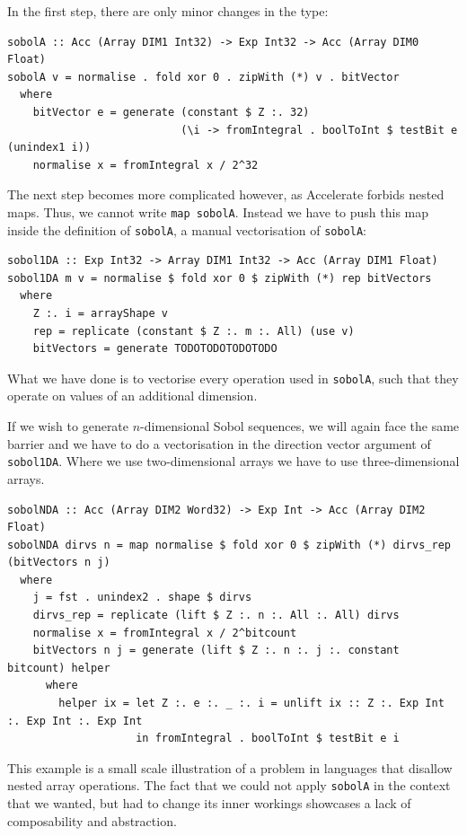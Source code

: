 \documentclass{llncs2e/llncs}
\begin{document}
In the first step, there are only minor changes in the type:
\begin{verbatim}
sobolA :: Acc (Array DIM1 Int32) -> Exp Int32 -> Acc (Array DIM0 Float)
sobolA v = normalise . fold xor 0 . zipWith (*) v . bitVector
  where
    bitVector e = generate (constant $ Z :. 32)
                           (\i -> fromIntegral . boolToInt $ testBit e (unindex1 i))
    normalise x = fromIntegral x / 2^32
\end{verbatim}

The next step becomes more complicated however, as Accelerate forbids
nested maps. Thus, we cannot write \verb|map sobolA|.
Instead we have to push this map inside the definition of
\verb|sobolA|, a manual vectorisation of \verb|sobolA|:
\begin{verbatim}
sobol1DA :: Exp Int32 -> Array DIM1 Int32 -> Acc (Array DIM1 Float)
sobol1DA m v = normalise $ fold xor 0 $ zipWith (*) rep bitVectors
  where
    Z :. i = arrayShape v
    rep = replicate (constant $ Z :. m :. All) (use v)
    bitVectors = generate TODOTODOTODOTODO
\end{verbatim}
What we have done is to vectorise every operation used in
\verb|sobolA|, such that they operate on values of an additional
dimension.

If we wish to generate $n$-dimensional Sobol sequences, we will again
face the same barrier and we have to do a vectorisation in the
direction vector argument of \verb|sobol1DA|. Where we use
two-dimensional arrays we have to use three-dimensional arrays. %

\begin{verbatim}
sobolNDA :: Acc (Array DIM2 Word32) -> Exp Int -> Acc (Array DIM2 Float)
sobolNDA dirvs n = map normalise $ fold xor 0 $ zipWith (*) dirvs_rep (bitVectors n j)
  where
    j = fst . unindex2 . shape $ dirvs
    dirvs_rep = replicate (lift $ Z :. n :. All :. All) dirvs
    normalise x = fromIntegral x / 2^bitcount
    bitVectors n j = generate (lift $ Z :. n :. j :. constant bitcount) helper
      where
        helper ix = let Z :. e :. _ :. i = unlift ix :: Z :. Exp Int :. Exp Int :. Exp Int
                    in fromIntegral . boolToInt $ testBit e i
\end{verbatim}

This example is a small scale illustration of a problem in languages
that disallow nested array operations. The fact that we could not
apply \verb|sobolA| in the context that we wanted, but had to change
its inner workings showcases a lack of composability and abstraction. %
\end{document}
